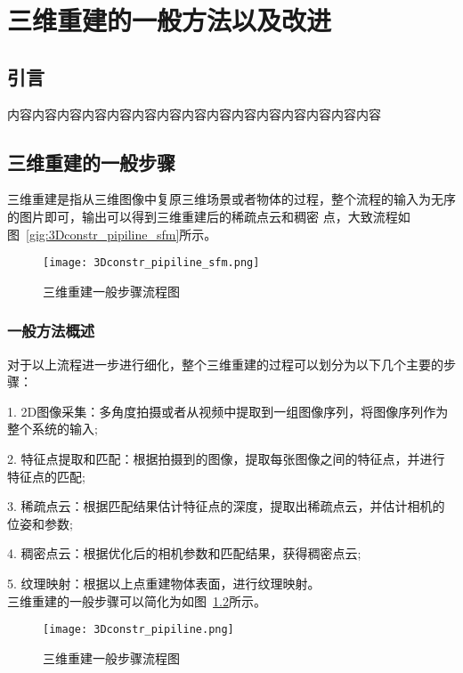 \chapter{三维重建的一般方法以及改进}
\label{cha:chap3}
\section{引言}
\label{sec:3.1}
内容内容内容内容内容内容内容内容内容内容内容内容内容内容内容
\section{三维重建的一般步骤}
\label{sec:3.2}
三维重建是指从三维图像中复原三维场景或者物体的过程，整个流程的输入为无序的图片即可，输出可以得到三维重建后的稀疏点云和稠密
点，大致流程如图~\ref{gig:3Dconstr_pipiline_sfm}所示。
\begin{figure}[H] %
    \centering
    \texttt{[image: 3Dconstr\_pipiline\_sfm.png]}
    \caption{三维重建一般步骤流程图}
    \label{fig:3Dconstr_pipiline_sfm}
    \end{figure}
\subsection{一般方法概述}
\label{sec:3.2.1}
对于以上流程进一步进行细化，整个三维重建的过程可以划分为以下几个主要的步骤：

1.  2D图像采集：多角度拍摄或者从视频中提取到一组图像序列，将图像序列作为整个系统的输入;

2.  特征点提取和匹配：根据拍摄到的图像，提取每张图像之间的特征点，并进行特征点的匹配;

3.  稀疏点云：根据匹配结果估计特征点的深度，提取出稀疏点云，并估计相机的位姿和参数;

4.  稠密点云：根据优化后的相机参数和匹配结果，获得稠密点云;

5.  纹理映射：根据以上点重建物体表面，进行纹理映射。\\
三维重建的一般步骤可以简化为如图~\ref{fig:3Dconstr_pipiline}所示。
\begin{figure}[H] %
    \centering
    \texttt{[image: 3Dconstr\_pipiline.png]}
    \caption{三维重建一般步骤流程图}
    \label{fig:3Dconstr_pipiline}
    \end{figure}

